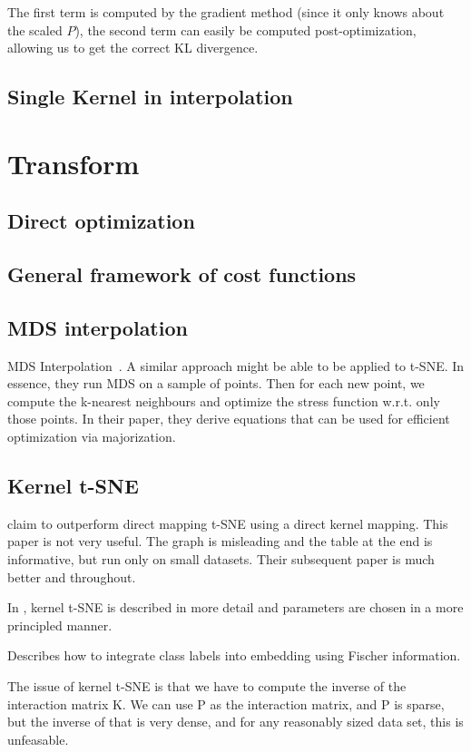 \documentclass[11pt]{article}
\begin{document}
The first term is computed by the gradient method (since it only knows about the scaled $P$), the second term can easily be computed post-optimization, allowing us to get the correct KL divergence.

\subsection{Single Kernel in interpolation}


\section{Transform}

\subsection{Direct optimization}

\subsection{General framework of cost functions}
\cite{bunte2012general}

\subsection{MDS interpolation}
MDS Interpolation~\cite{bae2010dimension}. A similar approach might be able to be applied to t-SNE. In essence, they run MDS on a sample of points. Then for each new point, we compute the k-nearest neighbours and optimize the stress function w.r.t. only those points. In their paper, they derive equations that can be used for efficient optimization via majorization.

\subsection{Kernel t-SNE}
\cite{gisbrecht2012out} claim to outperform direct mapping t-SNE using a direct kernel mapping. This paper is not very useful. The graph is misleading and the table at the end is informative, but run only on small datasets. Their subsequent paper is much better and throughout.

In \cite{gisbrecht2015parametric}, kernel t-SNE is described in more detail and parameters are chosen in a more principled manner.

Describes how to integrate class labels into embedding using Fischer information.

The issue of kernel t-SNE is that we have to compute the inverse of the interaction matrix K. We can use P as the interaction matrix, and P is sparse, but the inverse of that is very dense, and for any reasonably sized data set, this is unfeasable.




\end{document}
